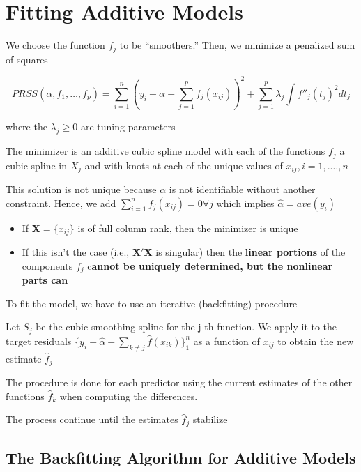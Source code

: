 \documentclass[
]{book}
\begin{document}
\hypertarget{fitting-additive-models}{%
\section{Fitting Additive Models}\label{fitting-additive-models}}

We choose the function \(f_j\) to be ``smoothers.'' Then, we minimize a penalized sum of squares

\[
PRSS(\alpha, f_1,\dots, f_p) = \sum_{i=1}^n (y_i - \alpha- \sum_{j=1}^p f_j(x_{ij}))^2 + \sum_{j=1}^p \lambda_j \int f''_j (t_j)^2 dt_j
\]

where the \(\lambda_j \ge 0\) are tuning parameters

The minimizer is an additive cubic spline model with each of the functions \(f_j\) a cubic spline in \(X_j\) and with knots at each of the unique values of \(x_{ij}, i = 1,. \dots, n\)

This solution is not unique because \(\alpha\) is not identifiable without another constraint. Hence, we add \(\sum_{i=1}^n f_j(x_{ij})=0 \forall j\) which implies \(\hat{\alpha}= ave(y_i)\)

\begin{itemize}
\item
  If \(\mathbf{X} = \{x_{ij}\}\) is of full column rank, then the minimizer is unique
\item
  If this isn't the case (i.e., \(\mathbf{X'X}\) is singular) then the \textbf{linear portions} of the components \(f_j\) c\textbf{annot be uniquely determined, but the nonlinear parts can}
\end{itemize}

To fit the model, we have to use an iterative (backfitting) procedure

Let \(S_j\) be the cubic smoothing spline for the j-th function. We apply it to the target residuals \(\{y_i - \hat{\alpha} - \sum_{k \neq j}\hat{f}(x_{ik}) \}^n_1\) as a function of \(x_{ij}\) to obtain the new estimate \(\hat{f}_j\)

The procedure is done for each predictor using the current estimates of the other functions \(\hat{f}_k\) when computing the differences.

The process continue until the estimates \(\hat{f}_j\) stabilize

\hypertarget{the-backfitting-algorithm-for-additive-models}{%
\subsection{The Backfitting Algorithm for Additive Models}\label{the-backfitting-algorithm-for-additive-models}}
\end{document}
